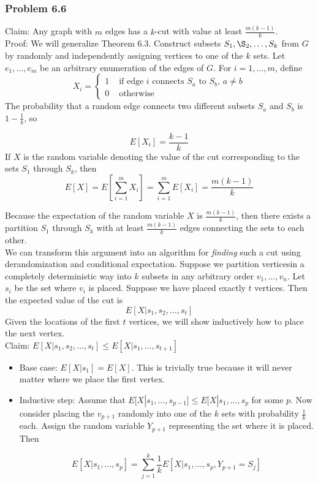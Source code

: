 \documentclass[12pt,letterpaper]{article}
\newenvironment{answer}[1]{
  \subsubsection*{Problem #1}
}{\newpage}
\begin{document}
\begin{answer}{6.6}
Claim: Any graph with $m$ edges has a $k$-cut with value at least $\frac{m(k-1)}{k}$.\\
Proof: We will generalize Theorem 6.3. Construct subsets $S_1,\S_2,\ldots,S_k$ from $G$ by randomly and independently assigning vertices to one of the $k$ sets. Let $e_1,\ldots,e_m$ be an arbitrary enumeration of the edges of $G$. For $i = 1,\ldots,m$, define
$$
	X_i = \begin{cases}
	1 &\mbox{ if edge $i$ connects $S_a$ to $S_b$, $a \ne b$}\\
	0 &\mbox{ otherwise}
	\end{cases}
$$
The probability that a random edge connects two different subsets $S_a$ and $S_b$ is $1 - \frac{1}{k}$, so

	$$E[X_i] = \frac{k - 1}{k}$$
If $X$ is the random variable denoting the value of the cut corresponding to the sets $S_1$ through $S_k$, then
	$$E[X] = E[\sum_{i=1}^m X_i] = \sum_{i=1}^m E[X_i] = \frac{m(k-1)}{k}$$

Because the expectation of the random variable $X$ is $\frac{m(k-1)}{k}$, then there exists a partition $S_1$ through $S_k$ with at least $\frac{m(k-1)}{k}$ edges connecting the sets to each other. \\

We can transform this argument into an algorithm for \emph{finding} such a cut using derandomization and conditional expectation. Suppose we partition verticesin a completely deterministic way into $k$ subsets in any arbitrary order $v_1,\ldots, v_n$. Let $s_i$ be the set where $v_i$ is placed. Suppose we have placed exactly $t$ vertices. Then the expected value of the cut is
	$$E[X | s_1,s_2,\ldots,s_t]$$
Given the locations of the first $t$ vertices, we will show inductively how to place the next vertex.\\
Claim: $E[X | s_1,s_2,\ldots,s_t] \le E[X | s_1,\ldots,s_{t+1}]$
\begin{itemize}
	\item Base case: $E[X | s_1] = E[X]$. This is trivially true because it will never matter where we place the first vertex.
	\item Inductive step: Assume that $E[X | s_1,\ldots,s_{p-1}] \le E[X | s_1,\ldots,s_{p}$ for some $p$. Now consider placing the $v_{p+1}$ randomly into one of the $k$ sets with probability $\frac{1}{k}$ each. Assign the random variable $Y_{p+1}$ representing the set where it is placed. Then

	$$E[X | s_1,\ldots,s_p] = \sum_{j=1}^k \frac{1}{k}E[X | s_1,\ldots,s_p,Y_{p+1} = S_j]$$


\end{itemize}
\end{answer}
\end{document}
